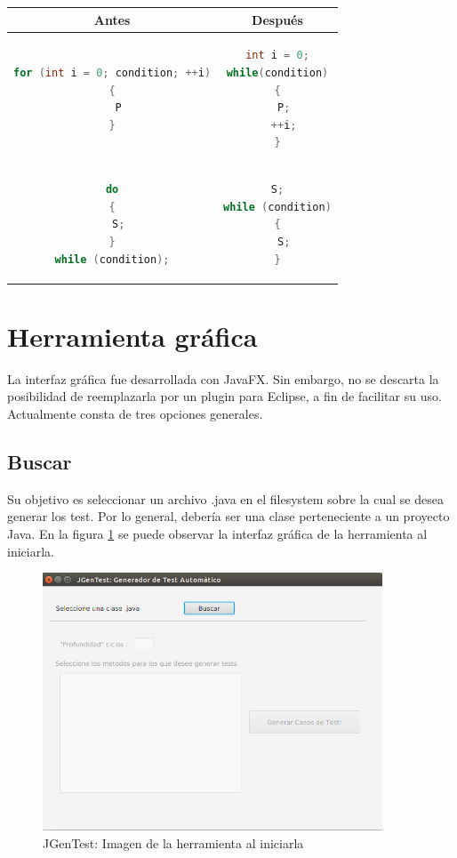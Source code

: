 \documentclass{llncs}
\begin{document}
\begin{table}
\centering
\begin{tabular}{|c | c|}
\hline
Antes & Después\\
\hline
\begin{lstlisting}[language=Java]
for (int i = 0; condition; ++i)
{
  P
}
\end{lstlisting} & 
\begin{lstlisting}[language=Java]
int i = 0;
while(condition)
{
  P;
  ++i;
}
\end{lstlisting}\\
\hline
\begin{lstlisting}[language=Java]
do
{
  S;
}
while (condition);
\end{lstlisting} & 
\begin{lstlisting}[language=Java]
S;
while (condition)
{
  S;
}
\end{lstlisting}\\
\hline
\end{tabular}
\end{table}

\section{Herramienta gráfica}\label{apend.B}
La interfaz gráfica fue desarrollada con JavaFX. Sin embargo, no se descarta la posibilidad de reemplazarla por un plugin para Eclipse, a fin de facilitar su uso.
Actualmente consta de tres opciones generales.

    \subsection{Buscar}
    Su objetivo es seleccionar un archivo .java en el filesystem sobre la cual se desea generar los test. Por lo general, debería ser una clase perteneciente a un proyecto
    Java. En la figura \ref{fig:buscarClaseJava} se puede observar la interfaz gráfica de la herramienta al iniciarla.
    \begin{figure}
    \centering
    \includegraphics[width=0.9\textwidth]{screenshots/1-inicial}
    \caption{JGenTest: Imagen de la herramienta al iniciarla}
    \label{fig:buscarClaseJava}
    \end{figure}
\end{document}
